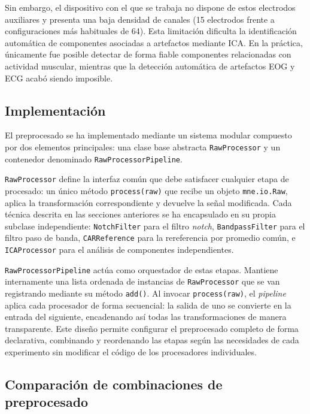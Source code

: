 Sin embargo, el dispositivo con el que se trabaja no dispone de estos electrodos auxiliares y presenta una baja densidad de canales (15 electrodos frente a configuraciones más habituales de 64). Esta limitación dificulta la identificación automática de componentes asociadas a artefactos mediante ICA. En la práctica, únicamente fue posible detectar de forma fiable componentes relacionadas con actividad muscular, mientras que la detección automática de artefactos EOG y ECG acabó siendo imposible.

\subsection{Implementación}
\label{subsec:preprocesado_implementacion}

El preprocesado se ha implementado mediante un sistema modular compuesto por dos elementos principales: una clase base abstracta \texttt{RawProcessor} y un contenedor denominado \texttt{RawProcessorPipeline}.

\texttt{RawProcessor} define la interfaz común que debe satisfacer cualquier etapa de procesado: un único método \texttt{process(raw)} que recibe un objeto \texttt{mne.io.Raw}, aplica la transformación correspondiente y devuelve la señal modificada. Cada técnica descrita en las secciones anteriores se ha encapsulado en su propia subclase independiente: \texttt{NotchFilter} para el filtro \textit{notch}, \texttt{BandpassFilter} para el filtro paso de banda, \texttt{CARReference} para la rereferencia por promedio común, e \texttt{ICAProcessor} para el análisis de componentes independientes.

\texttt{RawProcessorPipeline} actúa como orquestador de estas etapas. Mantiene internamente una lista ordenada de instancias de \texttt{RawProcessor} que se van registrando mediante su método \texttt{add()}. Al invocar \texttt{process(raw)}, el \textit{pipeline} aplica cada procesador de forma secuencial: la salida de uno se convierte en la entrada del siguiente, encadenando así todas las transformaciones de manera transparente. Este diseño permite configurar el preprocesado completo de forma declarativa, combinando y reordenando las etapas según las necesidades de cada experimento sin modificar el código de los procesadores individuales.

\subsection{Comparación de combinaciones de preprocesado}
\label{subsec:comparacion_filtros}

